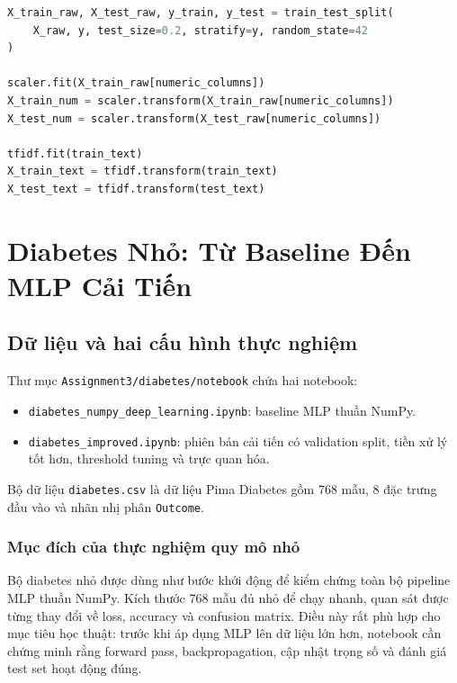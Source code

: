\documentclass[12pt,a4paper]{report}
\newcommand{\modelpath}[1]{\texttt{#1}}
\begin{document}
\begin{lstlisting}[language=Python, caption={Nguyên tắc fit trên train, transform trên validation/test}, label={lst:leakage}]
X_train_raw, X_test_raw, y_train, y_test = train_test_split(
    X_raw, y, test_size=0.2, stratify=y, random_state=42
)

scaler.fit(X_train_raw[numeric_columns])
X_train_num = scaler.transform(X_train_raw[numeric_columns])
X_test_num = scaler.transform(X_test_raw[numeric_columns])

tfidf.fit(train_text)
X_train_text = tfidf.transform(train_text)
X_test_text = tfidf.transform(test_text)
\end{lstlisting}

\chapter{Diabetes Nhỏ: Từ Baseline Đến MLP Cải Tiến}

\section{Dữ liệu và hai cấu hình thực nghiệm}
Thư mục \modelpath{Assignment3/diabetes/notebook} chứa hai notebook:
\begin{itemize}
    \item \modelpath{diabetes\_numpy\_deep\_learning.ipynb}: baseline MLP thuần NumPy.
    \item \modelpath{diabetes\_improved.ipynb}: phiên bản cải tiến có validation split, tiền xử lý tốt hơn, threshold tuning và trực quan hóa.
\end{itemize}
Bộ dữ liệu \modelpath{diabetes.csv} là dữ liệu Pima Diabetes gồm 768 mẫu, 8 đặc trưng đầu vào và nhãn nhị phân \texttt{Outcome}.

\subsection{Mục đích của thực nghiệm quy mô nhỏ}
Bộ diabetes nhỏ được dùng như bước khởi động để kiểm chứng toàn bộ pipeline MLP thuần NumPy.
Kích thước 768 mẫu đủ nhỏ để chạy nhanh, quan sát được từng thay đổi về loss, accuracy và confusion matrix.
Điều này rất phù hợp cho mục tiêu học thuật: trước khi áp dụng MLP lên dữ liệu lớn hơn, notebook cần chứng minh rằng forward pass, backpropagation, cập nhật trọng số và đánh giá test set hoạt động đúng.
\end{document}
